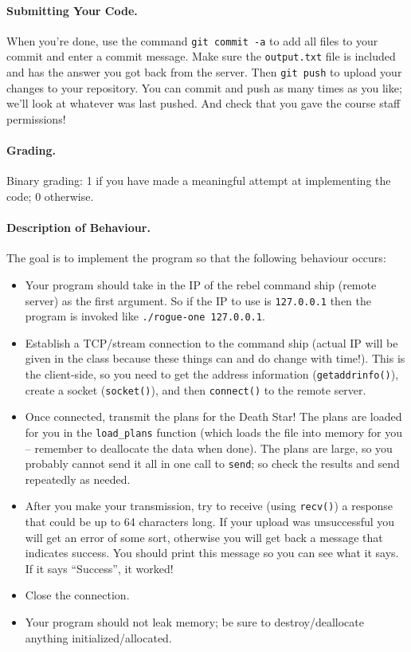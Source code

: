 \documentclass[a4paper]{report}
\begin{document}
\paragraph{Submitting Your Code.} When you're done, use the command \texttt{git commit -a} to add all files to your commit and enter a commit message. Make sure the \texttt{output.txt} file is included and has the answer you got back from the server. Then \texttt{git push} to upload your changes to your repository. You can commit and push as many times as you like; we'll look at whatever was last pushed. And check that you gave the course staff permissions!

\paragraph{Grading.} Binary grading: 1 if you have made a meaningful attempt at implementing the code; 0 otherwise.

\paragraph{Description of Behaviour.} The goal is to implement the program so that the following behaviour occurs:

\begin{itemize}
	\item Your program should take in the IP of the rebel command ship (remote server) as the first argument. So if the IP to use is \texttt{127.0.0.1} then the program is invoked like \texttt{./rogue-one 127.0.0.1}.
	\item Establish a TCP/stream connection to the command ship (actual IP will be given in the class because these things can and do change with time!). This is the client-side, so you need to get the address information (\texttt{getaddrinfo()}), create a socket (\texttt{socket()}), and then \texttt{connect()} to the remote server.
	\item Once connected, transmit the plans for the Death Star! The plans are loaded for you in the \texttt{load\_plans} function (which loads the file into memory for you -- remember to deallocate the data when done). The plans are large, so you probably cannot send it all in one call to \texttt{send}; so check the results and send repeatedly as needed.
	\item After you make your transmission, try to receive (using \texttt{recv()}) a response that could be up to 64 characters long. If your upload was unsuccessful you will get an error of some sort, otherwise you will get back a message that indicates success. You should print this message so you can see what it says. If it says ``Success'', it worked!
	\item Close the connection.
	\item Your program should not leak memory; be sure to destroy/deallocate anything initialized/allocated.
\end{itemize}
\end{document}
